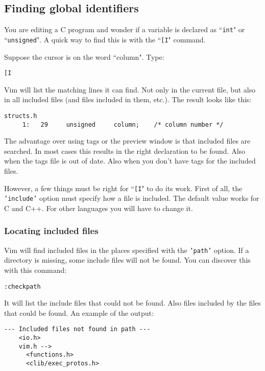 \subsection{Finding global identifiers}
You are editing a C program and wonder if a variable is declared as ``\texttt{int}" or ``\texttt{unsigned}".
A quick way to find this is with the ``\texttt{[I}" command.

Suppose the cursor is on the word ``column".
Type:

\begin{Verbatim}[samepage=true]
 [I
\end{Verbatim}

Vim will list the matching lines it can find.
Not only in the current file, but also in all included files (and files included in them, etc.).
The result looks like this:

\begin{Verbatim}[samepage=true]
    structs.h 
     1:   29     unsigned     column;    /* column number */ 
\end{Verbatim}

The advantage over using tags or the preview window is that included files are searched.
In most cases this results in the right declaration to be found.
Also when the tags file is out of date.
Also when you don't have tags for the included files.

However, a few things must be right for ``\texttt{[I}" to do its work.
First of all, the \texttt{'include'} option must specify how a file is included.
The default value works for C and C++.
For other languages you will have to change it.
\subsubsection{Locating included files}
Vim will find included files in the places specified with the \texttt{'path'} option.
If a directory is missing, some include files will not be found.
You can discover this with this command:

\begin{Verbatim}[samepage=true]
 :checkpath
\end{Verbatim}

It will list the include files that could not be found.
Also files included by the files that could be found.
An example of the output:

\begin{Verbatim}[samepage=true]
    --- Included files not found in path --- 
    <io.h> 
    vim.h --> 
      <functions.h> 
      <clib/exec_protos.h> 
\end{Verbatim}

